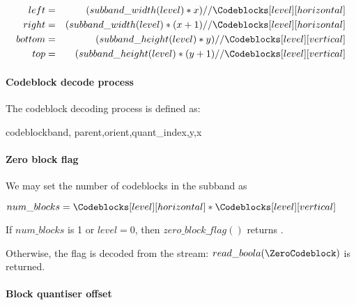 \begin{eqnarray*}
  left & = & (subband\_width(level)*x)//\Codeblocks[level][horizontal] \\
  right & = & (subband\_width(level)*(x+1)//\Codeblocks[level][horizontal] \\
  bottom & = & (subband\_height(level)*y)//\Codeblocks[level][vertical] \\
  top & = & (subband\_height(level)*(y+1)//\Codeblocks[level][vertical]
\end{eqnarray*}

\paragraph{Codeblock decode process\newline}

The codeblock decoding process is defined as:

\begin{pseudo}{codeblock}{band, parent,orient,quant\_index,y,x}
    \bsEND
  \bsEND
\bsELSE
    \bsEND
  \bsEND

\bsEND

\end{pseudo}

\paragraph{Zero block flag\newline}
\label{zeroblockflag}

We may set the number of codeblocks in the subband as

$num\_blocks = \Codeblocks[level][horizontal]*\Codeblocks[level][vertical]$

If $num\_blocks$ is 1 or $level=0$, then $zero\_block\_flag()$ returns \false.

Otherwise, the flag is decoded from the stream: $read\_boola(\ZeroCodeblock)$
is returned.

\paragraph{Block quantiser offset\newline}
\label{blockquantidx}

